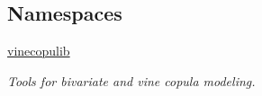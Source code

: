 \subsection*{Namespaces}
\begin{DoxyCompactItemize}
\item 
 \hyperlink{namespacevinecopulib}{vinecopulib}
\begin{DoxyCompactList}\small\item\em Tools for bivariate and vine copula modeling. \end{DoxyCompactList}\end{DoxyCompactItemize}
